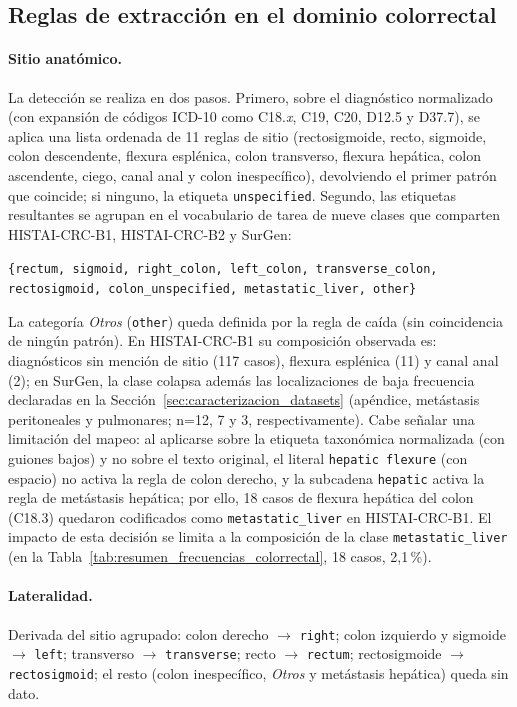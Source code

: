 \subsection{Reglas de extracción en el dominio colorrectal}

\paragraph{Sitio anatómico.} La detección se realiza en dos pasos. Primero, sobre el diagnóstico normalizado (con expansión de códigos ICD-10 como C18.\textit{x}, C19, C20, D12.5 y D37.7), se aplica una lista ordenada de 11 reglas de sitio (rectosigmoide, recto, sigmoide, colon descendente, flexura esplénica, colon transverso, flexura hepática, colon ascendente, ciego, canal anal y colon inespecífico), devolviendo el primer patrón que coincide; si ninguno, la etiqueta \texttt{unspecified}. Segundo, las etiquetas resultantes se agrupan en el vocabulario de tarea de nueve clases que comparten HISTAI-CRC-B1, HISTAI-CRC-B2 y SurGen:

\begin{center}
\small
\texttt{\{rectum, sigmoid, right\_colon, left\_colon, transverse\_colon, rectosigmoid, colon\_unspecified, metastatic\_liver, other\}}
\end{center}

La categoría \emph{Otros} (\texttt{other}) queda definida por la regla de caída (sin coincidencia de ningún patrón). En HISTAI-CRC-B1 su composición observada es: diagnósticos sin mención de sitio (117 casos), flexura esplénica (11) y canal anal (2); en SurGen, la clase colapsa además las localizaciones de baja frecuencia declaradas en la Sección~\ref{sec:caracterizacion_datasets} (apéndice, metástasis peritoneales y pulmonares; n=12, 7 y 3, respectivamente). Cabe señalar una limitación del mapeo: al aplicarse sobre la etiqueta taxonómica normalizada (con guiones bajos) y no sobre el texto original, el literal \texttt{hepatic flexure} (con espacio) no activa la regla de colon derecho, y la subcadena \texttt{hepatic} activa la regla de metástasis hepática; por ello, 18 casos de flexura hepática del colon (C18.3) quedaron codificados como \texttt{metastatic\_liver} en HISTAI-CRC-B1. El impacto de esta decisión se limita a la composición de la clase \texttt{metastatic\_liver} (en la Tabla~\ref{tab:resumen_frecuencias_colorrectal}, 18 casos, 2,1\,\%).

\paragraph{Lateralidad.} Derivada del sitio agrupado: colon derecho $\rightarrow$ \texttt{right}; colon izquierdo y sigmoide $\rightarrow$ \texttt{left}; transverso $\rightarrow$ \texttt{transverse}; recto $\rightarrow$ \texttt{rectum}; rectosigmoide $\rightarrow$ \texttt{rectosigmoid}; el resto (colon inespecífico, \emph{Otros} y metástasis hepática) queda sin dato.

